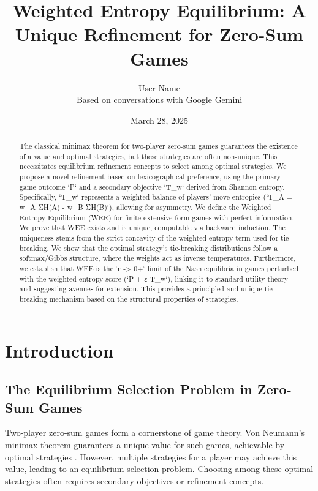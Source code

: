 \documentclass{article}
\title{Weighted Entropy Equilibrium: A Unique Refinement for Zero-Sum Games}
\author{User Name \\ {\small Based on conversations with Google Gemini}} %
\date{March 28, 2025}
\begin{document}
\maketitle

\begin{abstract}
The classical minimax theorem for two-player zero-sum games guarantees the existence of a value and optimal strategies, but these strategies are often non-unique. This necessitates equilibrium refinement concepts to select among optimal strategies. We propose a novel refinement based on lexicographical preference, using the primary game outcome `P` and a secondary objective `T_w` derived from Shannon entropy. Specifically, `T_w` represents a weighted balance of players' move entropies (`T_A = w_A ΣH(A) - w_B ΣH(B)`), allowing for asymmetry. We define the Weighted Entropy Equilibrium (WEE) for finite extensive form games with perfect information. We prove that WEE exists and is unique, computable via backward induction. The uniqueness stems from the strict concavity of the weighted entropy term used for tie-breaking. We show that the optimal strategy's tie-breaking distributions follow a softmax/Gibbs structure, where the weights act as inverse temperatures. Furthermore, we establish that WEE is the `ε -> 0+` limit of the Nash equilibria in games perturbed with the weighted entropy score (`P + ε T_w`), linking it to standard utility theory and suggesting avenues for extension. This provides a principled and unique tie-breaking mechanism based on the structural properties of strategies.
\end{abstract}

\section{Introduction}

\subsection{The Equilibrium Selection Problem in Zero-Sum Games}
Two-player zero-sum games form a cornerstone of game theory. Von Neumann's minimax theorem guarantees a unique value for such games, achievable by optimal strategies \cite{placeholder_vonneumann}. However, multiple strategies for a player may achieve this value, leading to an equilibrium selection problem. Choosing among these optimal strategies often requires secondary objectives or refinement concepts.
\end{document}
